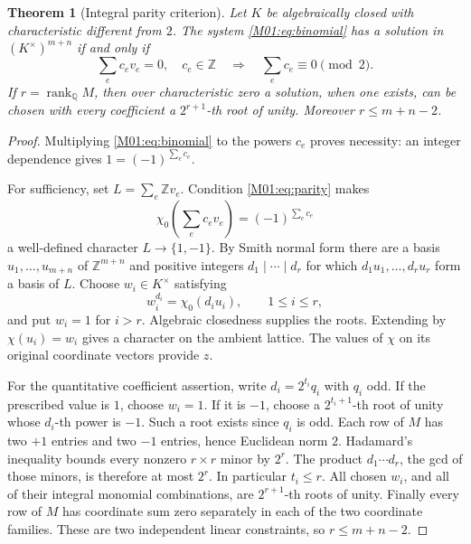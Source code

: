 \documentclass[11pt,a4paper,oneside]{report}
\newtheorem{theorem}{Theorem}[section]
\theoremstyle{definition}
\theoremstyle{remark}
\DeclareMathOperator{\rank}{rank}
\newcommand{\Q}{\mathbb Q}
\newcommand{\Z}{\mathbb Z}
\begin{document}
\begin{theorem}[Integral parity criterion]\label{M01:thm:pairs}
Let $K$ be algebraically closed with characteristic different from $2$.
The system \eqref{M01:eq:binomial} has a solution in
$(K^\times)^{m+n}$ if and only if
\begin{equation}\label{M01:eq:parity}
\sum_e c_e v_e=0,\quad c_e\in\Z
\quad\Longrightarrow\quad \sum_e c_e\equiv0\pmod2.
\end{equation}
If $r=\rank_{\Q}M$, then over characteristic zero a solution, when one
exists, can be chosen with every coefficient a $2^{r+1}$-th root of unity.
Moreover $r\le m+n-2$.
\end{theorem}
\begin{proof}
Multiplying \eqref{M01:eq:binomial} to the powers $c_e$ proves necessity:
an integer dependence gives $1=(-1)^{\sum_e c_e}$.

For sufficiency, set $L=\sum_e\Z v_e$. Condition \eqref{M01:eq:parity}
makes
\[
\chi_0\!\left(\sum_e c_e v_e\right)=(-1)^{\sum_e c_e}
\]
a well-defined character $L\to\{1,-1\}$. By Smith normal form there
are a basis $u_1,\ldots,u_{m+n}$ of $\Z^{m+n}$ and positive integers
$d_1\mid\cdots\mid d_r$ for which $d_1u_1,\ldots,d_ru_r$ form a
basis of $L$. Choose $w_i\in K^\times$ satisfying
\[
w_i^{d_i}=\chi_0(d_i u_i),\qquad 1\le i\le r,
\]
and put $w_i=1$ for $i>r$. Algebraic closedness supplies the roots.
Extending by $\chi(u_i)=w_i$ gives a character on the ambient lattice.
The values of $\chi$ on its original coordinate vectors provide $z$.

For the quantitative coefficient assertion, write $d_i=2^{t_i}q_i$ with
$q_i$ odd. If the prescribed value is $1$, choose $w_i=1$. If it is
$-1$, choose a $2^{t_i+1}$-th root of unity whose $d_i$-th power is
$-1$. Such a root exists since $q_i$ is odd. Each row of $M$ has two
$+1$ entries and two $-1$ entries, hence Euclidean norm $2$.
Hadamard's inequality bounds every nonzero $r\times r$ minor by $2^r$.
The product $d_1\cdots d_r$, the gcd of those minors, is therefore at
most $2^r$. In particular $t_i\le r$. All chosen $w_i$, and all of
their integral monomial combinations, are $2^{r+1}$-th roots of unity.
Finally every row of $M$ has coordinate sum zero separately in each
of the two coordinate families. These are two independent linear
constraints, so $r\le m+n-2$.
\end{proof}
\end{document}

